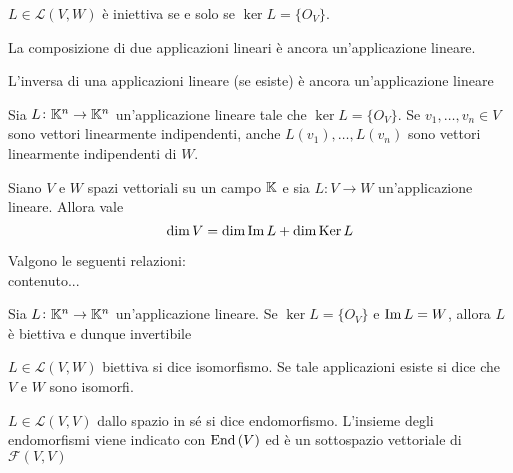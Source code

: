 \begin{prop}
	$ L \in \mathscr{L}{(V, W)} $ è iniettiva se e solo se $ \ker{L} = \{O_V\} $.
\end{prop}

\begin{prop}
	La composizione di due applicazioni lineari è ancora un'applicazione lineare.
\end{prop}

\begin{thm}
	L'inversa di una applicazioni lineare (se esiste) è ancora un'applicazione lineare
\end{thm}

\begin{thm}
	Sia $ L \colon \mathbb{K}^n \to \mathbb{K}^n $ un'applicazione lineare tale che $ \ker{L} = \{O_V\} $. Se $ v_1, \ldots, v_n \in V $ sono vettori linearmente indipendenti, anche $ L(v_1), \ldots, L(v_n) $ sono vettori linearmente indipendenti di $ W $.
\end{thm}

\begin{thm}
	Siano $ V $ e $ W $ spazi vettoriali su un campo $ \mathbb{K} $ e sia $ L \colon V \to W $  un'applicazione lineare. Allora vale \[\dim{V} = \dim{\operatorname{Im}{L}} + \dim{\operatorname{Ker}{L}}\]
\end{thm}

\begin{corollary}
	Valgono le seguenti relazioni:\\
	contenuto...
\end{corollary}

\begin{thm}
	Sia $ L \colon \mathbb{K}^n \to \mathbb{K}^n $ un'applicazione lineare. Se $ \ker{L} = \{O_V\} $ e $ \operatorname{Im}{L} = W $, allora $ L $ è biettiva e dunque invertibile
\end{thm}

\begin{definition}[Isomorfismo]
	$ L \in \mathscr{L}{(V, W)} $ biettiva si dice isomorfismo. Se tale applicazioni esiste si dice che $ V $ e $ W $ sono isomorfi.
\end{definition}

\begin{definition}[Endomorfismo]
	$ L \in \mathscr{L}{(V, V)} $ dallo spazio in sé si dice endomorfismo. L'insieme degli endomorfismi viene indicato con $ \operatorname{End}{(V)} $ ed è un sottospazio vettoriale di $ \mathscr{F}{(V, V)} $
\end{definition}

